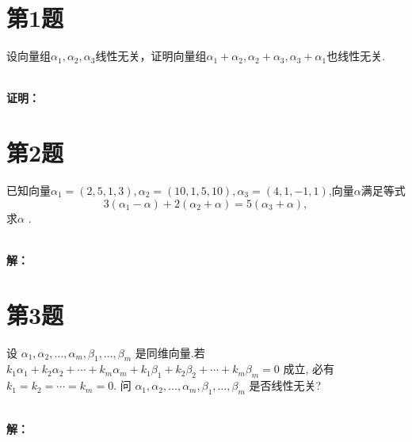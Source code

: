 \documentclass[a4paper, 12pt]{ctexart}
\begin{document}
\makeHomeworkTitle


\section{第1题}

\begin{exercise}
    设向量组$\alpha _{1} ,\alpha _{2} ,\alpha _{3}$线性无关，证明向量组$\alpha _{1} +\alpha _{2},\alpha _{2} +\alpha _{3} ,\alpha _{3} +\alpha _{1}$也线性无关.\\
      
\end{exercise}~\\

\noindent\textbf{证明：}\\


\section{第2题}
\begin{exercise}
已知向量$\alpha _{1} = (2,5,1,3),\alpha _{2} =(10,1,5,10),\alpha _{3} =(4,1,-1,1)$,向量$\alpha $满足等式\[
3(\alpha_1 - \alpha) + 2(\alpha_2 + \alpha) = 5(\alpha_3 + \alpha),
\]
求$\alpha$ .
\end{exercise}~\\
\noindent\textbf{解：}~\\

\section{第3题}
\begin{exercise}
设 $\alpha_1,\alpha_2,\ldots,\alpha_m,\beta_1,\ldots,\beta_m$ 是同维向量.若 $k_1\alpha_1 + k_2\alpha_2 + \cdots + k_m\alpha_m + k_1\beta_1 + k_2\beta_2 + \cdots + k_m\beta_m = 0$ 成立, 必有 $k_1 = k_2 = \cdots = k_m = 0.$ 问 $\alpha_1,\alpha_2,\ldots,\alpha_m,\beta_1,\ldots,\beta_m$ 是否线性无关?\\
\end{exercise}~\\
\noindent\textbf{解：}\\
\end{document}
